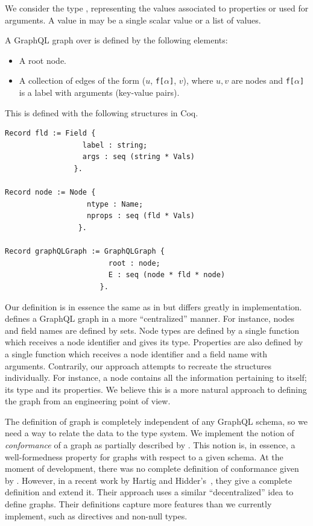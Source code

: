 We consider the type \Vals, representing the values associated to properties or used for arguments. A value in \Vals{} may be a single scalar value or a list of values.

\begin{definition}
A GraphQL graph over \Vals is defined by the following elements:
\begin{itemize}
    \item A root node.
    \item A collection of edges of the form ($u$, \texttt{f[}$\alpha$\texttt{]}, $v$), where $u, v$ are nodes and \texttt{f[}$\alpha$\texttt{]} is a label with arguments (key-value pairs).
\end{itemize}
\end{definition}

This is defined with the following structures in Coq.

\begin{verbatim}
Record fld := Field {
                  label : string;
                  args : seq (string * Vals)
                }.

Record node := Node {
                   ntype : Name;
                   nprops : seq (fld * Vals)
                 }.

Record graphQLGraph := GraphQLGraph {
                        root : node;
                        E : seq (node * fld * node)
                      }.
\end{verbatim}

Our definition is in essence the same as in \HP{} but differs greatly in implementation. \HP{} defines a GraphQL graph in a more ``centralized'' manner. For instance, nodes and field names are defined by sets. Node types are defined by a single function which receives a node identifier and gives its type. Properties are also defined by a single function which receives a node identifier and a field name with arguments. Contrarily, our approach attempts to recreate the structures individually. For instance, a node contains all the information pertaining to itself; its type and its properties. We believe this is a more natural approach to defining the graph from an engineering point of view.

The definition of graph is completely independent of any GraphQL schema, so we need a way to relate the data to the type system. We implement the notion of \textit{conformance}  of a graph as partially described by \HP{}. This notion is, in essence, a well-formedness property for graphs with respect to a given schema. At the moment of development, there was no complete definition of conformance given by \HP{}. However, in a recent work by Hartig and Hidder's~\cite{olafschema}, they give a complete definition and extend it. Their approach uses a similar ``decentralized'' idea to define graphs. Their definitions capture more features than we currently implement, such as directives and non-null types.

